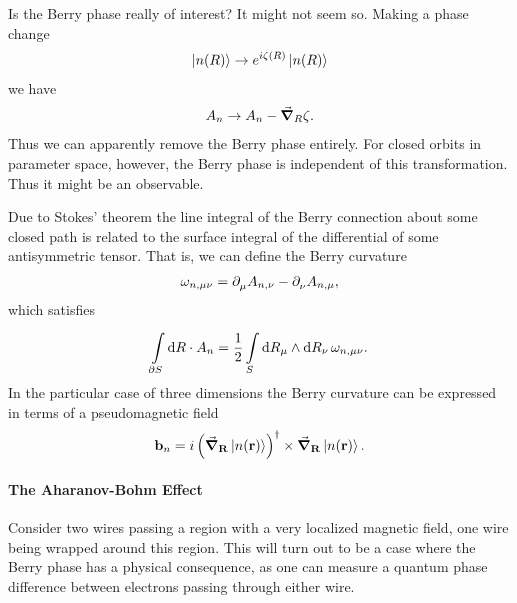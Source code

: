 Is the Berry phase really of interest? It might not seem so. Making a phase change
\begin{align*}
	\ket{n(R)}\to e^{i\zeta(R)}\ket{n(R)}
\end{align*}
we have
\begin{align*}
	A_{n}\to A_{n} - \grad_{R}\zeta.
\end{align*}
Thus we can apparently remove the Berry phase entirely. For closed orbits in parameter space, however, the Berry phase is independent of this transformation. Thus it might be an observable.

Due to Stokes' theorem the line integral of the Berry connection about some closed path is related to the surface integral of the differential of some antisymmetric tensor. That is, we can define the Berry curvature
\begin{align*}
	\omega_{n, \mu\nu} = \partial^{}_{\mu}A_{n, \nu} - \partial^{}_{\nu}A_{n, \mu},
\end{align*}
which satisfies
\begin{align*}
	\int\limits_{\partial S}^{}\dd{R}\cdot A_{n} = \frac{1}{2}\int\limits_{S}^{}\dd{R_{\mu}}\wedge\dd{R_{\nu}}\omega_{n, \mu\nu}.
\end{align*}
In the particular case of three dimensions the Berry curvature can be expressed in terms of a pseudomagnetic field
\begin{align*}
	\vb{b}_{n} = i\left(\grad_{\vb{R}}\ket{n(\vb{r})}\right)^{\dagger}\times\grad_{\vb{R}}\ket{n(\vb{r})}.
\end{align*}

\paragraph{The Aharanov-Bohm Effect}
Consider two wires passing a region with a very localized magnetic field, one wire being wrapped around this region. This will turn out to be a case where the Berry phase has a physical consequence, as one can measure a quantum phase difference between electrons passing through either wire.

